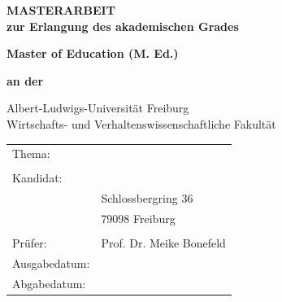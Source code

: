 \thispagestyle{empty}
{
	\setlength{\parskip}{1cm}
	\begin{center}
		\vspace*{1cm}
		\textbf{\Huge MASTERARBEIT}
		\vspace{2cm}\\
		
		\textbf{zur Erlangung des akademischen Grades}
		
		\textbf{\Large Master of Education (M. Ed.)}
		
		\textbf{an der}
		
		{\huge Albert-Ludwigs-Universität Freiburg}\\
		
		{\Large Wirtschafts- und Verhaltenswissenschaftliche Fakultät}
		\vspace{1cm}
		
		\renewcommand{\arraystretch}{1.0}	%
		\begin{tabular}{p{4cm} p{10cm}}
			Thema: & \thetitle \\&\\
			Kandidat: & \theauthor \\
			& Schlossbergring 36 \\
			& 79098 Freiburg \\&\\
			Prüfer: & Prof. Dr. Meike Bonefeld \\
			Ausgabedatum: & \datestart \\
			Abgabedatum: & \dateend \\
		\end{tabular}
		\renewcommand{\arraystretch}{1.5}	%
	\end{center}
}
\newpage



